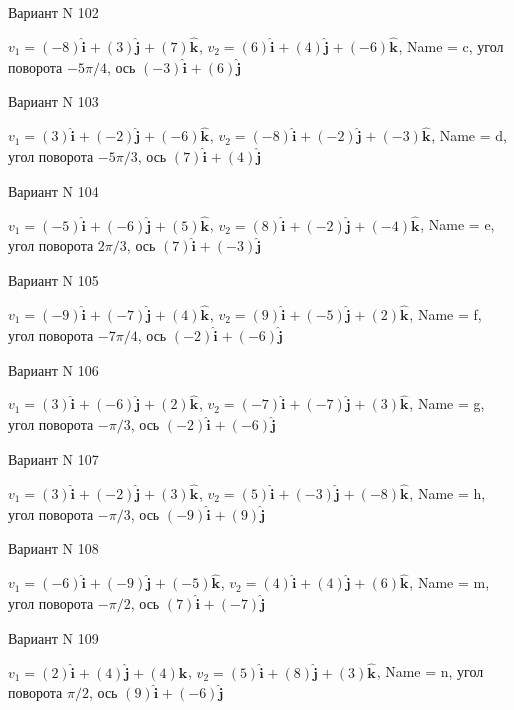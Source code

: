 \documentclass[11pt]{report}
\begin{document}
Вариант N 102

$v_1 = (-8)\mathbf{\hat{i}_{}} + (3)\mathbf{\hat{j}_{}} + (7)\mathbf{\hat{k}_{}}$, $v_2 = (6)\mathbf{\hat{i}_{}} + (4)\mathbf{\hat{j}_{}} + (-6)\mathbf{\hat{k}_{}}$, Name = c, угол поворота $- 5 \pi / 4$, ось $(-3)\mathbf{\hat{i}_{}} + (6)\mathbf{\hat{j}_{}}$

Вариант N 103

$v_1 = (3)\mathbf{\hat{i}_{}} + (-2)\mathbf{\hat{j}_{}} + (-6)\mathbf{\hat{k}_{}}$, $v_2 = (-8)\mathbf{\hat{i}_{}} + (-2)\mathbf{\hat{j}_{}} + (-3)\mathbf{\hat{k}_{}}$, Name = d, угол поворота $- 5 \pi / 3$, ось $(7)\mathbf{\hat{i}_{}} + (4)\mathbf{\hat{j}_{}}$

Вариант N 104

$v_1 = (-5)\mathbf{\hat{i}_{}} + (-6)\mathbf{\hat{j}_{}} + (5)\mathbf{\hat{k}_{}}$, $v_2 = (8)\mathbf{\hat{i}_{}} + (-2)\mathbf{\hat{j}_{}} + (-4)\mathbf{\hat{k}_{}}$, Name = e, угол поворота $2 \pi / 3$, ось $(7)\mathbf{\hat{i}_{}} + (-3)\mathbf{\hat{j}_{}}$

Вариант N 105

$v_1 = (-9)\mathbf{\hat{i}_{}} + (-7)\mathbf{\hat{j}_{}} + (4)\mathbf{\hat{k}_{}}$, $v_2 = (9)\mathbf{\hat{i}_{}} + (-5)\mathbf{\hat{j}_{}} + (2)\mathbf{\hat{k}_{}}$, Name = f, угол поворота $- 7 \pi / 4$, ось $(-2)\mathbf{\hat{i}_{}} + (-6)\mathbf{\hat{j}_{}}$

Вариант N 106

$v_1 = (3)\mathbf{\hat{i}_{}} + (-6)\mathbf{\hat{j}_{}} + (2)\mathbf{\hat{k}_{}}$, $v_2 = (-7)\mathbf{\hat{i}_{}} + (-7)\mathbf{\hat{j}_{}} + (3)\mathbf{\hat{k}_{}}$, Name = g, угол поворота $- \pi / 3$, ось $(-2)\mathbf{\hat{i}_{}} + (-6)\mathbf{\hat{j}_{}}$

Вариант N 107

$v_1 = (3)\mathbf{\hat{i}_{}} + (-2)\mathbf{\hat{j}_{}} + (3)\mathbf{\hat{k}_{}}$, $v_2 = (5)\mathbf{\hat{i}_{}} + (-3)\mathbf{\hat{j}_{}} + (-8)\mathbf{\hat{k}_{}}$, Name = h, угол поворота $- \pi / 3$, ось $(-9)\mathbf{\hat{i}_{}} + (9)\mathbf{\hat{j}_{}}$

Вариант N 108

$v_1 = (-6)\mathbf{\hat{i}_{}} + (-9)\mathbf{\hat{j}_{}} + (-5)\mathbf{\hat{k}_{}}$, $v_2 = (4)\mathbf{\hat{i}_{}} + (4)\mathbf{\hat{j}_{}} + (6)\mathbf{\hat{k}_{}}$, Name = m, угол поворота $- \pi / 2$, ось $(7)\mathbf{\hat{i}_{}} + (-7)\mathbf{\hat{j}_{}}$

Вариант N 109

$v_1 = (2)\mathbf{\hat{i}_{}} + (4)\mathbf{\hat{j}_{}} + (4)\mathbf{\hat{k}_{}}$, $v_2 = (5)\mathbf{\hat{i}_{}} + (8)\mathbf{\hat{j}_{}} + (3)\mathbf{\hat{k}_{}}$, Name = n, угол поворота $\pi / 2$, ось $(9)\mathbf{\hat{i}_{}} + (-6)\mathbf{\hat{j}_{}}$
\end{document}
